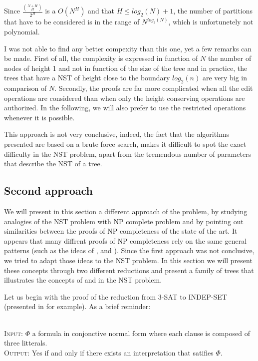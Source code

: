 Since $\frac{\binom{N+H}{H}}{2^H}$ is a $O(N^H)$ and that $H \leqslant
log_{2}(N)+1$, the number of partitions that have to be considered is
in the range of $N^{log_{2}(N)}$, which is unfortunetely not
polynomial.

I was not able to find any better compexity than this one, yet a few
remarks can be made. First of all, the complexity is expressed in
function of $N$ the number of nodes of height 1 and not in function of
the size of the tree and in practice, the trees that have a NST of
height close to the boundary $log_{2}(n)$ are very big in comparison
of $N$. Secondly, the proofs are far more complicated when all the
edit operations are considered than when only the height conserving
operations are authorized. In the following, we will also prefer to
use the restricted operations whenever it is possible.

This approach is not very conclusive, indeed, the fact that the
algorithms presented are based on a brute force search, makes it
difficult to spot the exact difficulty in the NST problem, apart from
the tremendous number of parameters that describe the NST of a tree.

\subsection{Second approach}

We will present in this section a different approach of the problem,
by studying analogies of the NST problem with NP complete problem and
by pointing out similarities between the proofs of NP completeness of
the state of the art. It appears that many diffrent proofs of NP
completeness rely on the same general patterns (such as the ideas of
\variables, \widgets and \constraints). Since the first approach was
not conclusive, we tried to adapt those ideas to the NST problem. In
this section we will present these concepts through two different
reductions and present a family of trees that illustrates the concepts
of \variables and \widgets in the NST problem.

Let us begin with the proof of the reduction from 3-SAT to INDEP-SET
(presented in \cite{polytech} for example). As a brief reminder:

\begin{definition}[3-SAT]
\ \\
\textsc{Input:} $\Phi$ a formula in conjonctive normal form where each
clause is composed of three litterals. \\
\textsc{Output:} Yes if and only if there exists an interpretation
that satifies $\Phi$.\\
\end{definition}


